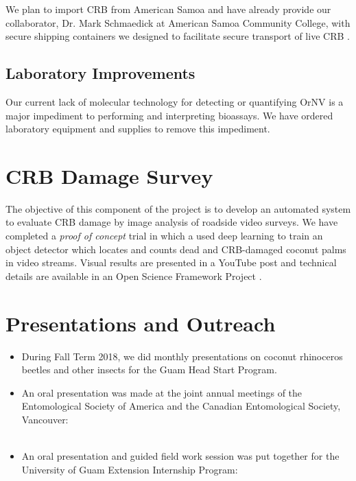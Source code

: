 \documentclass[12pt,letterpaper,english,bibliography=totocnumbered]{scrartcl}
\begin{document}
We plan to import CRB from American Samoa and have already provide our collaborator, Dr. Mark Schmaedick at American Samoa Community College, with secure shipping containers we designed to facilitate secure transport of live CRB \cite{moore_container_2017-1}.

\subsection{Laboratory Improvements}

Our current lack of molecular technology for detecting or quantifying OrNV is a major impediment to performing and interpreting bioassays. We have ordered laboratory equipment and supplies to remove this impediment. 


\section{CRB Damage Survey}

The objective of this component of the project is to develop an automated system to evaluate CRB damage by image analysis of roadside video surveys.  We have completed a \textit{proof of concept} trial in which a used deep learning to train an object detector which locates and counts dead and CRB-damaged coconut palms in video streams.  Visual results are presented in a YouTube post \cite{moore_training_2019} and technical details are available in an Open Science Framework Project \cite{moore_open_2019}.

\section{Presentations and Outreach}

\begin{itemize}
	\item During Fall Term 2018, we did monthly presentations on coconut rhinoceros beetles and other insects for the Guam Head Start Program.
	\item An oral presentation was made at the joint annual meetings of the Entomological Society of America and the Canadian Entomological Society, Vancouver: \\\\ 
	\item An oral presentation and guided field work session was put together for the University of Guam Extension Internship Program: \\\\ 	
\end{itemize}
\end{document}
